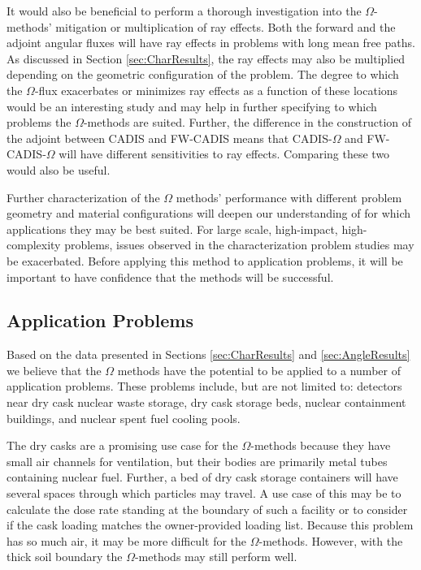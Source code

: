 It would also be beneficial to
perform a thorough investigation into the $\Omega$-methods' mitigation or
multiplication of ray effects. Both the forward and the adjoint angular fluxes
will have ray effects in problems with long mean free paths. As discussed in
Section \ref{sec:CharResults},
the ray effects may also be multiplied depending on the geometric
configuration of the problem. The degree to which the $\Omega$-flux exacerbates
or minimizes ray effects as a function of these locations would be an
interesting study and may help in further specifying to which problems the
$\Omega$-methods are suited. Further, the difference in the construction of the
adjoint between CADIS and FW-CADIS means that CADIS-$\Omega$ and
FW-CADIS-$\Omega$ will have different sensitivities to ray effects. Comparing
these two would also be useful.

Further characterization of the $\Omega$ methods' performance with different
problem geometry and material configurations will deepen our understanding of for
which applications they may be best suited. For large scale, high-impact,
high-complexity problems, issues observed in the characterization problem
studies may be exacerbated. Before applying this method to application problems,
it will be important to have confidence that the methods will be successful.

\subsection{Application Problems}
\label{subsec:appprobs}

Based on the data presented in Sections \ref{sec:CharResults} and
\ref{sec:AngleResults} we believe that the
$\Omega$ methods have the potential to be applied to a number of application problems.
These
problems include, but are not limited to: detectors near dry cask nuclear waste
storage, dry cask storage beds, nuclear containment buildings, and nuclear spent fuel
cooling pools.

The dry casks are a promising use case for the $\Omega$-methods because
they have small air
channels for ventilation, but their bodies are primarily metal tubes containing
nuclear fuel. 
Further, a bed of dry cask storage containers will have several spaces through
which particles may travel. A use case of this may be to calculate the dose rate
standing at the boundary of such a facility or to consider if the cask loading matches 
the owner-provided loading list. Because this problem has so much
air, it may be more difficult for the $\Omega$-methods. However, with the thick
soil boundary the $\Omega$-methods may still perform well.

